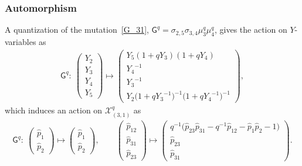 \documentclass[10pt,a4paper]{amsart}
\numberwithin{equation}{section}
\begin{document}
\subsubsection*{Automorphism}
A quantization of the mutation~\eqref{G_31}, $\mathsf{G}^q=\sigma_{2,5} \sigma_{3,4} \mu^q_3 \mu^q_4$, gives the action on $Y$-variables as
\begin{gather*}
 \mathsf{G}^q \colon \
 \begin{pmatrix}
 Y_2 \\ Y_3 \\ Y_4 \\ Y_5
 \end{pmatrix}
 \mapsto
 \begin{pmatrix}
 Y_5 ( 1 + q Y_3 ) ( 1 + q Y_4 ) \\
 {Y_4}^{-1} \\
 {Y_3}^{-1} \\
 Y_2 \big( 1 + q {Y_3}^{-1} \big)^{-1} \big( 1 + q {Y_4}^{-1} \big)^{-1}
 \end{pmatrix} ,
\end{gather*}
which induces an action on $\mathcal{X}^q_{(3,1)}$ as
\begin{gather*}
 \mathsf{G}^q\colon \
 \begin{pmatrix}
 \hat{p}_1 \\
 \hat{p}_2
 \end{pmatrix}
 \mapsto
 \begin{pmatrix}
 \hat{p}_1 \\
 \hat{p}_2
 \end{pmatrix} , \qquad
 \begin{pmatrix}
 \hat{p}_{12} \\
 \hat{p}_{31} \\
 \hat{p}_{23}
 \end{pmatrix}
 \mapsto
 \begin{pmatrix}
 q^{-1} \big( \hat{p}_{23} \hat{p}_{31} - q^{-1} \hat{p}_{12} - \hat{p}_1 \hat{p}_2 -1 \big) \\
 \hat{p}_{23} \\
 \hat{p}_{31}
 \end{pmatrix} .
\end{gather*}
\end{document}
